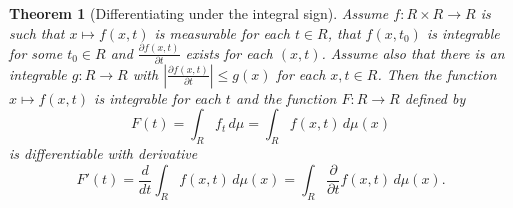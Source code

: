 \documentclass{article}
\newtheorem{theorem}{Theorem}[section]
\theoremstyle{definition}
\begin{document}

\begin{theorem}[Differentiating under the integral sign]
  Assume $f : R \times R \to R$ is such that $x \mapsto f(x, t)$ is measurable
  for each $t \in R$, that $f(x, t_0)$ is integrable for some $t_0 \in R$ and
  $\frac{\partial f(x, t)}{\partial t}$ exists for each $(x, t)$. Assume also
  that there is an integrable $g : R \to R$ with $\left| \frac{\partial f(x,
      t)}{\partial t} \right| \le g(x)$ for each $x, t \in R$. Then the function
  $x \mapsto f(x, t)$ is integrable for each $t$ and the function $F : R \to R$
  defined by
  \[ F(t) = \int_R f_t\,d\mu = \int_R f(x, t)\,d\mu(x) \]
  is differentiable with derivative
  \[ F'(t) = \frac{d}{dt} \int_R f(x, t)\,d\mu(x) = \int_R
    \frac{\partial}{\partial t} f(x, t)\,d\mu(x). \]
\end{theorem}
\end{document}
